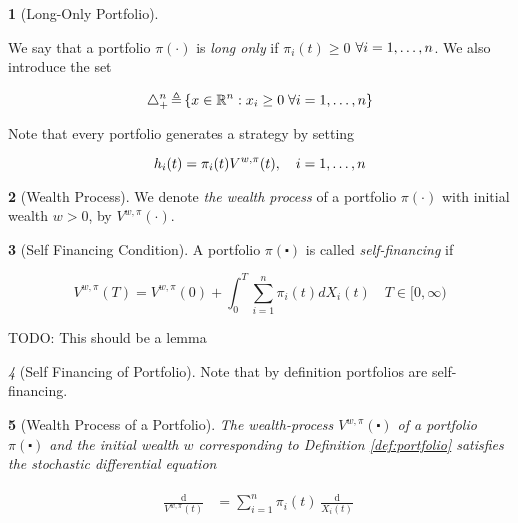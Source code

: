 \documentclass[british]{amsart}
\numberwithin{equation}{section}
\numberwithin{figure}{section}
\theoremstyle{plain}
\newtheorem{thm}{\protect\theoremname}[section]
\theoremstyle{definition}
\newtheorem{defn}[thm]{\protect\definitionname}
\theoremstyle{plain}
\theoremstyle{plain}
\theoremstyle{plain}
\theoremstyle{remark}
\newtheorem{rem}[thm]{\protect\remarkname}
\theoremstyle{plain}
\providecommand{\definitionname}{Definition}
\providecommand{\remarkname}{Remark}
\providecommand{\theoremname}{Theorem}
\renewcommand{\d}[1]{\mathop{\mathrm{d}{#1}}}
\newcommand{\defeq}{\mathop{\triangleq}}
\begin{document}
\begin{defn} [Long-Only Portfolio]
	\label{def:longonlyportfolio}

	We say that a portfolio $\pi(\cdot)$ is \textit{long only} if 
	$\pi_{i}(t) \ge 0$ $\forall i=1,\dots,n$. We also introduce the set 

	\begin{equation}
		\triangle_{+}^{n} \defeq 
		\left\{ x\in\mathbb{R}^{n}:x_{i}\ge0\;\forall \rangei \right\} 
 	\end{equation}

\end{defn}

Note that every portfolio generates a strategy by setting 

\begin{equation}
	h_i(t) = \pi_{i}(t)V^{w,\pi}(t),
	\quad i=1,\dots,n
\end{equation}

\begin{defn} [Wealth Process]
	
	We denote \textit{the wealth process} of a portfolio $\pi(\cdot)$ with initial 
	wealth $w > 0$, by $V^{w,\pi}(\cdot)$.

\end{defn}

\begin{defn} [Self Financing Condition]
	
	A portfolio $\pi(\centerdot)$ is called \textit{self-financing} if 
	
	\begin{equation}
		V^{w,\pi}(T) = V^{w,\pi}(0) + \int_{0}^{T} \sum_{i=1}^{n} \pi_{i}(t) dX_{i}(t)
		\quad T \in [0, \infty)
 	\end{equation}

\end{defn}

TODO: This should be a lemma
\begin{rem} [Self Financing of Portfolio]
	Note that by definition portfolios are self-financing.
\end{rem}
 
\begin{thm} [Wealth Process of a Portfolio]

	The wealth-process $V^{w,\pi}(\centerdot)$ of a portfolio $\pi(\centerdot)$ and the initial 
	wealth $w$ corresponding to Definition \ref{def:portfolio} satisfies the stochastic differential 
	equation

	\begin{gather}
		\label{eq:wealthprocess}
		\begin{split}
			\frac{\d{V^{w,\pi}(t)}}{V^{w,\pi}(t)} &=
				\sum_{i=1}^{n}\pi_{i}(t)\frac{\d{X_{i}(t)}}{X_{i}(t)} \\
		\end{split}
	\end{gather}

\end{thm}
\end{document}
